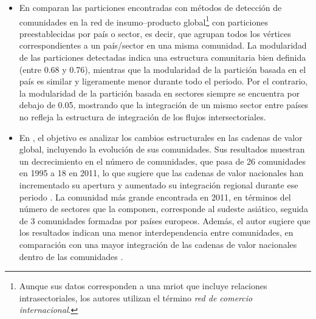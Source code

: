 \begin{itemize}
	\item En \textcite{Maluck2015} comparan las particiones encontradas con métodos de detección de comunidades en la red de insumo--producto global\footnote{Aunque sus datos corresponden a una \gls{mriot} que incluye relaciones intrasectoriales, los autores utilizan el término \textit{red de comercio internacional}.} con particiones preestablecidas por país o sector, 
	es decir, que agrupan todos los vértices correspondientes a un país/sector en una misma comunidad. La modularidad de las particiones detectadas indica una estructura comunitaria bien definida (entre 0.68 y 0.76), mientras que la modularidad de la partición basada en el país es similar y ligeramente menor durante todo el periodo. Por el contrario, la modularidad de la partición basada en sectores siempre se encuentra por debajo de 0.05, mostrando que la integración de un mismo sector entre países no refleja la estructura de integración de los flujos intersectoriales.

	
	\item En \textcite{Tsekeris2017}, el objetivo es analizar los cambios estructurales en las cadenas de valor global,
	incluyendo la evolución de sus comunidades. 
    Sus resultados muestran un decrecimiento en el número de comunidades, que pasa de 26 comunidades en 1995 a 18 en 2011, lo que sugiere que las cadenas de valor nacionales han incrementado su apertura y aumentado su integración regional durante ese periodo \parencite[p.~196]{Tsekeris2017}.
    La comunidad más grande encontrada en 2011, en términos del número de sectores que la componen, corresponde al sudeste asiático, seguida de 3 comunidades formadas por países europeos. Además, el autor sugiere que los resultados indican una menor interdependencia entre comunidades, en comparación con una mayor integración de las cadenas de valor nacionales dentro de las comunidades \parencite[p.~197]{Tsekeris2017}. 


\end{itemize}
